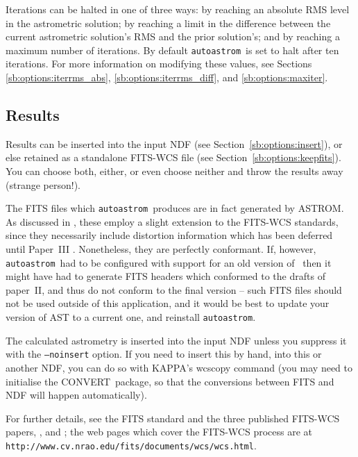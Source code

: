 \documentclass[twoside,11pt,nolof]{starlink}
\providecommand{\AST}{\xref{{\footnotesize AST}}{sun210}{}}
\providecommand{\ASTROM}{{\footnotesize ASTROM}\normalsize}
\providecommand{\autoastrom}{\texttt{autoastrom}}
\providecommand{\CONVERT}{{\footnotesize CONVERT}\normalsize}
\providecommand{\KAPPA}{{\footnotesize KAPPA}\normalsize}
\begin{document}
Iterations can be halted in one of three ways: by reaching an absolute RMS
level in the astrometric solution; by reaching a limit in the difference
between the current astrometric solution's RMS and the prior solution's; and
by reaching a maximum number of iterations. By default \autoastrom\ is set to
halt after ten iterations. For more information on modifying these values, see
Sections \ref{sb:options:iterrms_abs}, \ref{sb:options:iterrms_diff}, and
\ref{sb:options:maxiter}.

\subsection{Results\label{sb:results}}

Results can be inserted into the input NDF (see
Section~\ref{sb:options:insert}), or else retained as a standalone FITS-WCS
file (see Section~\ref{sb:options:keepfits}).  You can choose both, either, or
even choose neither and throw the results away (strange person!).

The FITS files which \autoastrom\ produces are in fact generated by \ASTROM.
As discussed in , these employ a slight extension to the FITS-WCS
standards, since they necessarily include distortion information which has
been deferred until Paper~III \cite{fitswcs3}.  Nonetheless, they are
perfectly conformant.  If, however, \autoastrom\ had to be configured with
support for an old version of \AST\, then it might have had to generate FITS
headers which conformed to the drafts of paper~II, and thus do not conform to
the final version -- such FITS files should not be used outside of this
application, and it would be best to update your version of AST to a current
one, and reinstall \autoastrom.

The calculated astrometry is inserted into the input NDF unless you suppress
it with the \texttt{--noinsert} option.  If you need to insert this by hand,
into this or another NDF, you can do so with \KAPPA's wcscopy command (you may
need to initialise the \CONVERT\ package, so that the conversions between FITS
and NDF will happen automatically).

For further details, see the FITS standard \cite{nost-100-2} and the three
published FITS-WCS papers, \cite[FITS WCS Paper I]{fitswcs1}, \cite[FITS WCS
Paper II]{fitswcs2} and \cite[FITS WCS Paper III]{fitswcs3}; the web pages
which cover the FITS-WCS process are at
\texttt{http://www.cv.nrao.edu/fits/documents/wcs/wcs.html}.
\end{document}
